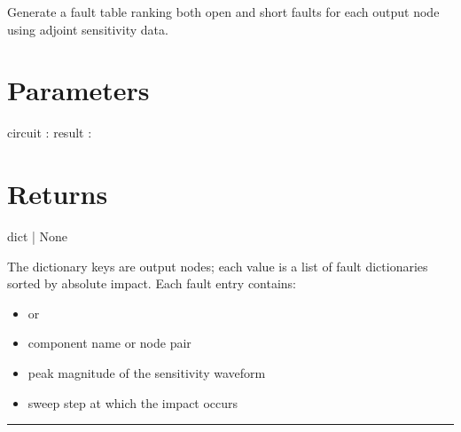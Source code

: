 \documentclass[letterpaper,10pt,english]{sphinxmanual}
\begin{document}
\begin{fulllineitems}
\label{\detokenize{fault_analysis:perform_global_ranking}}
\pysigstartsignatures
\pysiglinewithargsret
{}
{\sphinxparamcomma {}}
{}
\pysigstopsignatures
\sphinxAtStartPar
Generate a fault table ranking both open and short faults for each output node
using adjoint sensitivity data.


\section{Parameters}
\label{\detokenize{fault_analysis:id1}}
\sphinxAtStartPar
circuit : {\hyperref[\detokenize{circuit:Circuit}]{}}
result : {\hyperref[\detokenize{results:SimulationResult}]{}}


\section{Returns}
\label{\detokenize{fault_analysis:id2}}
\sphinxAtStartPar
dict | None

\sphinxAtStartPar
The dictionary keys are output nodes; each value is a list of fault dictionaries
sorted by absolute impact.  Each fault entry contains:
\begin{itemize}
\item {} 
\sphinxAtStartPar
{} \textendash{}  or 

\item {} 
\sphinxAtStartPar
{} \textendash{} component name or node pair

\item {} 
\sphinxAtStartPar
{} \textendash{} peak magnitude of the sensitivity waveform

\item {} 
\sphinxAtStartPar
{} \textendash{} sweep step at which the impact occurs

\end{itemize}

\end{fulllineitems}



\bigskip\hrule\bigskip
\end{document}
